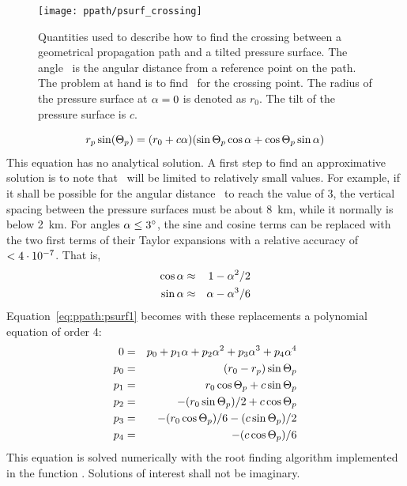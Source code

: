 \begin{figure}
 \begin{minipage}[c]{0.45\textwidth}
 \texttt{[image: ppath/psurf\_crossing]}
 \end{minipage}%
 \begin{minipage}[c]{0.55\textwidth}
  \caption{Quantities used to describe how to find the crossing between a 
    geometrical propagation path and a tilted pressure surface. The
    angle \Lat\ is the angular distance from a reference point on the
    path. The problem at hand is to find \Lat\ for the crossing
    point. The radius of the pressure surface at $\alpha = 0$ is
    denoted as $r_0$. The tilt of the pressure surface is $c$.}
  \label{fig:ppath:psurf_crossing}
 \end{minipage}%
\end{figure}   

\begin{equation}
   r_{p} \sin(\Theta_p) = (r_{0}+c\alpha) 
           (\sin\Theta_p \cos\alpha + \cos\Theta_p \sin\alpha)
 \label{eq:ppath:psurf1}
\end{equation}
This equation has no analytical solution. A first step to find an
approximative solution is to note that \Lat\ will be limited to
relatively small values. For example, if it shall be possible for the
angular distance \Lat\ to reach the value of 3\degree, the vertical
spacing between the pressure surfaces must be about 8~km, while it
normally is below 2~km. For angles $\alpha \leq 3^\circ$, the sine and
cosine terms can be replaced with the two first terms of their Taylor
expansions with a relative accuracy of $< 4\cdot10^{-7}$. That is,
\begin{eqnarray}
  \cos \alpha & \approx & 1 - \alpha^2 / 2    \nonumber \\
  \sin \alpha & \approx & \alpha - \alpha^3 / 6 \nonumber
\end{eqnarray}
Equation~\ref{eq:ppath:psurf1} becomes with these replacements a
polynomial equation of order 4:
\begin{eqnarray}
  0 & = & p_0 + p_1 \alpha + p_2 \alpha^2 + p_3 \alpha^3 + p_4 \alpha^4 \\
  p_0 & = & (r_{0}-r_{p}) \sin\Theta_p \nonumber \\ 
  p_1 & = & r_{0}\cos\Theta_p + c \sin\Theta_p \nonumber \\ 
  p_2 & = & -(r_{0}\sin\Theta_p)/2 + c\cos\Theta_p  \nonumber \\ 
  p_3 & = & -(r_{0}\cos\Theta_p)/6 - (c\sin\Theta_p)/2 \nonumber \\ 
  p_4 & = & -(c \cos\Theta_p)/6  \nonumber 
  \label{eq:ppath:psurf2}
\end{eqnarray}
This equation is solved numerically with the root finding algorithm
implemented in the function . Solutions of
interest shall not be imaginary.

